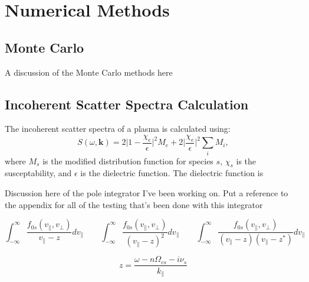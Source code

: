 \chapter{Numerical Methods}

\section{Monte Carlo}

A discussion of the Monte Carlo methods here



\section{Incoherent Scatter Spectra Calculation}
The incoherent scatter spectra of a plasma is calculated using: %
\begin{equation}
		S(\omega, \mathbf{k}) = 2 \bigg| 1 - \frac{\chi_e}{\epsilon} \bigg|^2 M_e
						+ 2 \bigg| \frac{\chi_e}{\epsilon} \bigg|^2 \sum_i M_i,
\end{equation}
where $M_s$ is the modified distribution function for species $s$,
$\chi_s$ is the susceptability, 
and $\epsilon$ is the dielectric function. 
The dielectric function is 


Discussion here of the pole integrator I've been working on. 
Put a reference to the appendix for all of the testing that's been done with this integrator


\begin{equation}
	\int_{-\infty}^\infty \frac{f_{0s}(v_\parallel,v_\perp)}{v_\parallel - z} dv_\parallel
	\qquad
	\int_{-\infty}^\infty \frac{f_{0s}(v_\parallel,v_\perp)}{(v_\parallel - z)^2} dv_\parallel
	\qquad
	\int_{-\infty}^\infty \frac{f_{0s}(v_\parallel,v_\perp)}{(v_\parallel - z)(v_\parallel - z^*)} dv_\parallel
\end{equation}

\begin{equation}
	z = \frac{\omega - n\Omega_{cs}- i \nu_s}{k_\parallel}
\end{equation}

